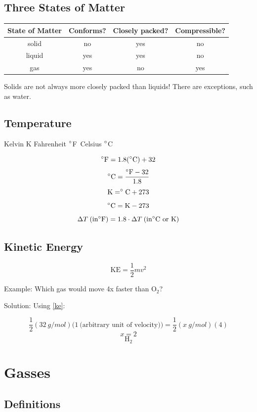 \documentclass[a4paper, 12pt]{article}
\newcommand{\degC}{$\degree$C \,}
\newcommand{\degF}{$\degree$F \,}
\begin{document}
\subsection{Three States of Matter}

\begin{table}[H]

\begin{tabular}{c|c|c|c}
\textbf{State of Matter} & \textbf{Conforms?} & \textbf{Closely packed?} & \textbf{Compressible?} \\\hline
solid & no & yes & no \\
liquid & yes & yes & no \\
gas & yes & no & yes
\end{tabular}

\vspace{1em}
Solids are not always more closely packed than liquids! There are exceptions, such as water.

\end{table}

\subsection{Temperature}
Kelvin K Fahrenheit \degF Celsius \degC

$$\degree \text{F} = 1.8(\degree\text{C}) + 32$$
$$\degree \text{C} = \frac{\degree \text{F} -32}{1.8}$$
$$\text{K} = \degree\text{C} + 273$$
$$\degree\text{C} = \text{K} - 273$$
$$\Delta T \: (\text{in} \degree\text{F}) = 1.8 \cdot \Delta T \: (\text{in} \degree\text{C or K})$$

\subsection{Kinetic Energy}
\begin{equation}\label{ke}
    \text{KE} = \frac{1}{2}mv^2
\end{equation}

Example: Which gas would move 4x faster than O$_2$?

Solution: Using \ref{ke}:

$$\frac{1}{2}(32 \: g/mol)(1 \: \text{(arbitrary unit of velocity))} = \frac{1}{2}(x \: g/mol)(4)$$
$$x = 2$$
$$\boxed{\text{H}_2}$$

\section{Gasses}

\subsection{Definitions}
\end{document}
